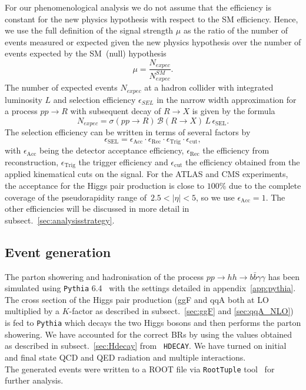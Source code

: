 For our phenomenological analysis we do not assume that the efficiency is constant for the new physics hypothesis with respect to the SM efficiency.  Hence, we use the full definition of the signal strength $\mu$ as the ratio of the number of events measured or expected given the new physics hypothesis over the number of events expected by the SM~(null) hypothesis
\begin{equation}
	\mu = \frac{ N_{expec}}{ N^{SM}_{expec}}.
\end{equation}
The number of expected events $ N_{expec}$ at a hadron collider with integrated luminosity $L$ and selection efficiency $\epsilon_{SEL}$  in the narrow width approximation for a process $pp\to R$ with subsequent decay of $R\to X$ is given by the formula
\begin{equation}
	N_{expec} = \sigma(pp\to R) \, \mathcal B(R \to X)\, L \, \epsilon_{\mathrm{SEL}}.
\end{equation}
The selection efficiency can be written in terms of several factors by
\begin{equation}
	\epsilon_{\mathrm{SEL}} = \epsilon_{\mathrm{Acc}} \cdot \epsilon_{\mathrm{Rec}} \cdot \epsilon_{\mathrm{Trig}}\cdot \epsilon_{\mathrm{cut}},
\end{equation}
with $ \epsilon_{\mathrm{Acc}}$ being the detector acceptance efficiency, $ \epsilon_{\mathrm{Rec}}$ the efficiency from reconstruction,  $\epsilon_{\mathrm{Trig}}$ the trigger efficiency and $\epsilon_{\mathrm{cut}}$ the efficiency obtained from the applied kinematical cuts on the signal. For the ATLAS and CMS experiments, the acceptance for the Higgs pair production is close to $100 \%$ due to the complete coverage of the pseudorapidity range of~$2.5< |\eta |< 5$, so we use $\epsilon_{\mathrm{Acc}}=1$.
The other efficiencies will be discussed in more detail in subsect.~\ref{sec:analysisstrategy}.
\subsection{Event generation}
The parton showering and hadronisation of the process $pp \to hh \to b \bar b \gamma \gamma$ has been simulated using \texttt{Pythia} 6.4~\cite{Sjostrand:2006za} with the settings detailed in appendix~\ref{app:pythia}. The cross section of the Higgs pair production (ggF and qqA both at LO multiplied by a $K$-factor as described in subsect.~\ref{sec:ggF} and \ref{sec:qqA_NLO}) is fed to \texttt{Pythia} which decays the two Higgs bosons and then performs the parton showering. We have accounted for the correct BRs by using the values obtained as described in subsect.~\ref{sec:Hdecay} from \texttt{ HDECAY}. We have turned on initial and final state QCD and QED radiation and multiple interactions.  \\
The generated events were written to a ROOT file via \texttt{RootTuple} tool~\cite{roottuple} for further analysis.
